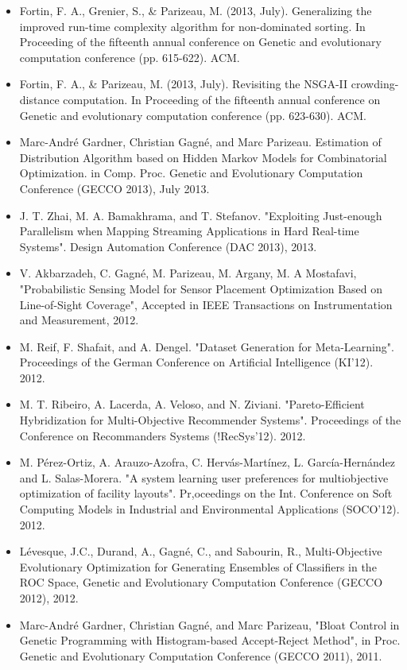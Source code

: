 \documentclass{article}
\begin{document}
\begin{itemize}
		\item  Fortin, F. A., Grenier, S., & Parizeau, M. (2013, July). Generalizing the improved run-time complexity algorithm for non-dominated sorting. In Proceeding of the fifteenth annual conference on Genetic and evolutionary computation conference (pp. 615-622). ACM.
		\item  Fortin, F. A., & Parizeau, M. (2013, July). Revisiting the NSGA-II crowding-distance computation. In Proceeding of the fifteenth annual conference on Genetic and evolutionary computation conference (pp. 623-630). ACM.
		\item  Marc-André Gardner, Christian Gagné, and Marc Parizeau. Estimation of Distribution Algorithm based on Hidden Markov Models for Combinatorial Optimization. in Comp. Proc. Genetic and Evolutionary Computation Conference (GECCO 2013), July 2013.
		\item  J. T. Zhai, M. A. Bamakhrama, and T. Stefanov. "Exploiting Just-enough Parallelism when Mapping Streaming Applications in Hard Real-time Systems". Design Automation Conference (DAC 2013), 2013.
		\item  V. Akbarzadeh, C. Gagné, M. Parizeau, M. Argany, M. A Mostafavi, "Probabilistic Sensing Model for Sensor Placement Optimization Based on Line-of-Sight Coverage", Accepted in IEEE Transactions on Instrumentation and Measurement, 2012.
		\item   M. Reif, F. Shafait, and A. Dengel. "Dataset Generation for Meta-Learning". Proceedings of the German Conference on Artificial Intelligence (KI'12). 2012.
		\item  M. T. Ribeiro, A. Lacerda, A. Veloso, and N. Ziviani. "Pareto-Efficient Hybridization for Multi-Objective Recommender Systems". Proceedings of the Conference on Recommanders Systems (!RecSys'12). 2012.
		\item   M. Pérez-Ortiz, A. Arauzo-Azofra, C. Hervás-Martínez, L. García-Hernández and L. Salas-Morera. "A system learning user preferences for multiobjective optimization of facility layouts". Pr,oceedings on the Int. Conference on Soft Computing Models in Industrial and Environmental Applications (SOCO'12). 2012.
		\item    Lévesque, J.C., Durand, A., Gagné, C., and Sabourin, R., Multi-Objective Evolutionary Optimization for Generating Ensembles of Classifiers in the ROC Space, Genetic and Evolutionary Computation Conference (GECCO 2012), 2012.
		\item    Marc-André Gardner, Christian Gagné, and Marc Parizeau, "Bloat Control in Genetic Programming with Histogram-based Accept-Reject Method", in Proc. Genetic and Evolutionary Computation Conference (GECCO 2011), 2011.

\end{itemize}
\end{document}
